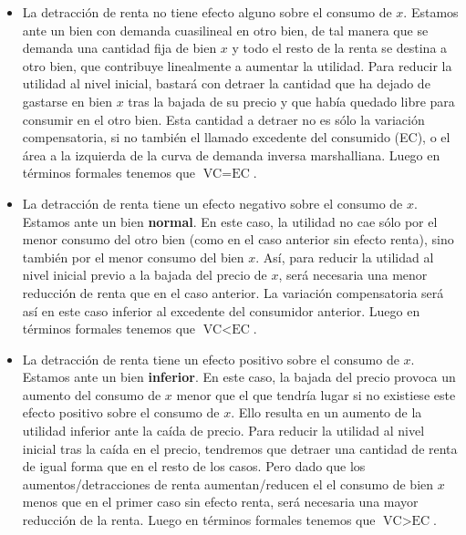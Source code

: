 \documentclass{nuevotema}
\begin{document}
\begin{itemize}
	\item La detracción de renta no tiene efecto alguno sobre el consumo de $x$. Estamos ante un bien con demanda cuasilineal en otro bien, de tal manera que se demanda una cantidad fija de bien $x$ y todo el resto de la renta se destina a otro bien, que contribuye linealmente a aumentar la utilidad. Para reducir la utilidad al nivel inicial, bastará con detraer la cantidad que ha dejado de gastarse en bien $x$ tras la bajada de su precio y que había quedado libre para consumir en el otro bien. Esta cantidad a detraer no es sólo la variación compensatoria, si no también el llamado excedente del consumido (EC), o el área a la izquierda de la curva de demanda inversa marshalliana. Luego en términos formales tenemos que $\text{VC}=\text{EC}$.
	\item La detracción de renta tiene un efecto negativo sobre el consumo de $x$. Estamos ante un bien \textbf{normal}. En este caso, la utilidad no cae sólo por el menor consumo del otro bien (como en el caso anterior sin efecto renta), sino también por el menor consumo del bien $x$. Así, para reducir la utilidad al nivel inicial previo a la bajada del precio de $x$, será necesaria una menor reducción de renta que en el caso anterior. La variación compensatoria será así en este caso inferior al excedente del consumidor anterior. Luego en términos formales tenemos que $\text{VC} < \text{EC}$.
	\item La detracción de renta tiene un efecto positivo sobre el consumo de $x$. Estamos ante un bien \textbf{inferior}. En este caso, la bajada del precio provoca un aumento del consumo de $x$ menor que el que tendría lugar si no existiese este efecto positivo sobre el consumo de $x$. Ello resulta en un aumento de la utilidad inferior ante la caída de precio. Para reducir la utilidad al nivel inicial tras la caída en el precio, tendremos que detraer una cantidad de renta de igual forma que en el resto de los casos. Pero dado que los aumentos/detracciones de renta aumentan/reducen el el consumo de bien $x$ menos que en el primer caso sin efecto renta, será necesaria una mayor reducción de la renta. Luego en términos formales tenemos que $\text{VC} > \text{EC}$.
\end{itemize}
\end{document}
